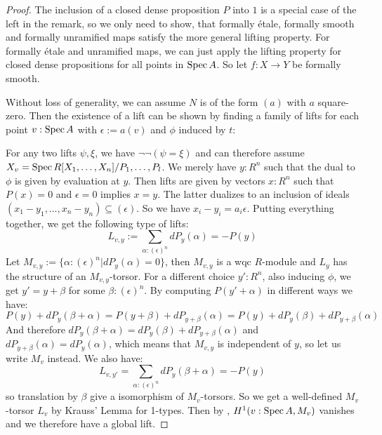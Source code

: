 \begin{proof}
  The inclusion of a closed dense proposition $P$ into $1$ is a special case of the left in the remark, so we only need to show, that formally étale,
  formally smooth and formally unramified maps satisfy the more general lifting property.
  For formally étale and unramified maps, we can just apply the lifting property for closed dense propositions for all points in $\operatorname{Spec} A$.
  So let $f:X\to Y$ be formally smooth.
  
  Without loss of generality, we can assume $N$ is of the form $(a)$ with $a$ square-zero.
  Then the existence of a lift can be shown
  by finding a family of lifts for each point $v:\operatorname{Spec} A$ with $\epsilon:=a(v)$ and $\phi$ induced by $t$:
  \begin{center}
  \end{center}
  For any two lifts $\psi,\xi$, we have $\neg\neg(\psi=\xi)$
  and can therefore assume $X_v=\operatorname{Spec} R[X_1,\dots,X_n]/P_1,\dots,P_l$.
  We merely have $y:R^n$ such that the dual to $\phi$ is given by evaluation at $y$.
  Then lifts are given by vectors $x:R^n$ such that $P(x)=0$ and $\epsilon = 0$ implies $x=y$.
  The latter dualizes to an inclusion of ideals $(x_1-y_1,\dots,x_n-y_n)\subseteq (\epsilon)$.
  So we have $x_i-y_i=a_i\epsilon$.
  Putting everything together, we get the following type of lifts:
  \[L_{v,y}:=\sum_{\alpha:(\epsilon)^n}dP_y(\alpha)=-P(y) \]
  Let $M_{v,y}:=\{\alpha:(\epsilon)^n\vert dP_y(\alpha)=0\}$, then  $M_{v,y}$ is a wqc $R$-module and $L_y$ has the structure of an $M_{v,y}$-torsor.
  For a different choice $y':R^n$, also inducing $\phi$, we get $y'=y+\beta$ for some $\beta:(\epsilon)^n$.
  By computing $P(y'+\alpha)$ in different ways we have:
  \[P(y)+dP_y(\beta+\alpha)=P(y+\beta)+dP_{y+\beta}(\alpha)=P(y)+dP_y(\beta)+dP_{y+\beta}(\alpha)\]
  And therefore $dP_y(\beta+\alpha)=dP_y(\beta)+dP_{y+\beta}(\alpha)$ and $dP_{y+\beta}(\alpha)=dP_y(\alpha)$, which means that $M_{v,y}$ is independent of $y$, so let us write $M_v$ instead.
  We also have:
  \[L_{v,y'}=\sum_{\alpha:(\epsilon)^n}dP_y(\beta+\alpha)=-P(y)\]
  so translation by $\beta$ give a isomorphism of $M_{v}$-torsors.
  So we get a well-defined $M_v$-torsor $L_v$ by Krauss' Lemma for 1-types.
  Then by \cite{draft}, $H^1(v:\operatorname{Spec} A, M_v)$ vanishes and we therefore have a global lift. 
\end{proof}

